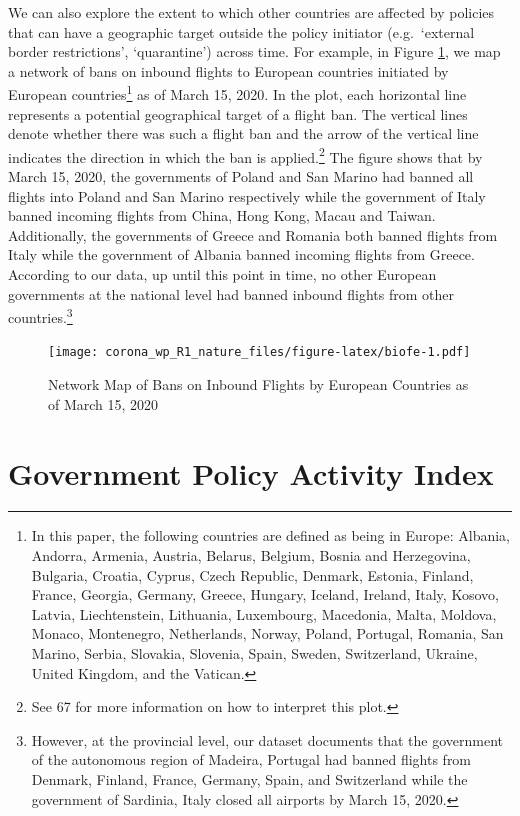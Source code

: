 \documentclass[]{article}
\let\rmarkdownfootnote\footnote%
\def\footnote{\protect\rmarkdownfootnote}
\begin{document}
We can also explore the extent to which other countries are affected by policies that can have a geographic target outside the policy initiator (e.g.~`external border restrictions', `quarantine') across time. For example, in Figure \ref{fig:biofe}, we map a network of bans on inbound flights to European countries initiated by European countries\footnote{In this paper, the following countries are defined as being in Europe: Albania, Andorra, Armenia, Austria, Belarus, Belgium, Bosnia and Herzegovina, Bulgaria, Croatia, Cyprus, Czech Republic, Denmark, Estonia, Finland, France, Georgia, Germany, Greece, Hungary, Iceland, Ireland, Italy, Kosovo, Latvia, Liechtenstein, Lithuania, Luxembourg, Macedonia, Malta, Moldova, Monaco, Montenegro, Netherlands, Norway, Poland, Portugal, Romania, San Marino, Serbia, Slovakia, Slovenia, Spain, Sweden, Switzerland, Ukraine, United Kingdom, and the Vatican.} as of March 15, 2020. In the plot, each horizontal line represents a potential geographical target of a flight ban. The vertical lines denote whether there was such a flight ban and the arrow of the vertical line indicates the direction in which the ban is applied.\footnote{See 67 for more information on how to interpret this plot.} The figure shows that by March 15, 2020, the governments of Poland and San Marino had banned all flights into Poland and San Marino respectively while the government of Italy banned incoming flights from China, Hong Kong, Macau and Taiwan. Additionally, the governments of Greece and Romania both banned flights from Italy while the government of Albania banned incoming flights from Greece. According to our data, up until this point in time, no other European governments at the national level had banned inbound flights from other countries.\footnote{However, at the provincial level, our dataset documents that the government of the autonomous region of Madeira, Portugal had banned flights from Denmark, Finland, France, Germany, Spain, and Switzerland while the government of Sardinia, Italy closed all airports by March 15, 2020.}

\begin{figure}
\centering
\texttt{[image: corona\_wp\_R1\_nature\_files/figure-latex/biofe-1.pdf]}
\caption{\label{fig:biofe}Network Map of Bans on Inbound Flights by European Countries as of March 15, 2020}
\end{figure}

\hypertarget{government-policy-activity-index}{%
\section*{Government Policy Activity Index}\label{government-policy-activity-index}}
\end{document}
